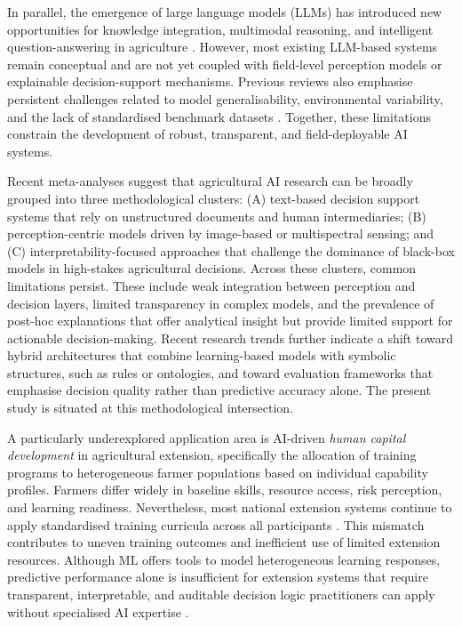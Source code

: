 \documentclass[3p,twocolumn,authoryear]{elsarticle}
\begin{document}
In parallel, the emergence of large language models (LLMs) has introduced
new opportunities for knowledge integration, multimodal reasoning, and
intelligent question-answering in agriculture
\citep{li2025llm}.
However, most existing LLM-based systems remain conceptual and are not yet
coupled with field-level perception models or explainable
decision-support mechanisms.
Previous reviews also emphasise persistent challenges related to model
generalisability, environmental variability, and the lack of standardised
benchmark datasets
\citep{hossain2022cattle,ennaji2023nutrient}.
Together, these limitations constrain the development of robust,
transparent, and field-deployable AI systems.

Recent meta-analyses suggest that agricultural AI research can be broadly
grouped into three methodological clusters:
(A) text-based decision support systems that rely on unstructured
documents and human intermediaries;
(B) perception-centric models driven by image-based or multispectral
sensing; and
(C) interpretability-focused approaches that challenge the dominance of
black-box models in high-stakes agricultural decisions.
Across these clusters, common limitations persist.
These include weak integration between perception and decision layers,
limited transparency in complex models, and the prevalence of post-hoc
explanations that offer analytical insight but provide limited support for
actionable decision-making.
Recent research trends further indicate a shift toward hybrid
architectures that combine learning-based models with symbolic structures,
such as rules or ontologies, and toward evaluation frameworks that
emphasise decision quality rather than predictive accuracy alone.
The present study is situated at this methodological intersection.

A particularly underexplored application area is AI-driven
\textit{human capital development} in agricultural extension, specifically
the allocation of training programs to heterogeneous farmer populations
based on individual capability profiles.
Farmers differ widely in baseline skills, resource access, risk
perception, and learning readiness.
Nevertheless, most national extension systems continue to apply
standardised training curricula across all participants
\citep{anderson2004,feder1985}.
This mismatch contributes to uneven training outcomes and inefficient use
of limited extension resources.
Although ML offers tools to model heterogeneous learning responses,
predictive performance alone is insufficient for extension systems that
require transparent, interpretable, and auditable decision logic
practitioners can apply without specialised AI expertise
\citep{arrieta2020,lundberg2020}.
\end{document}
